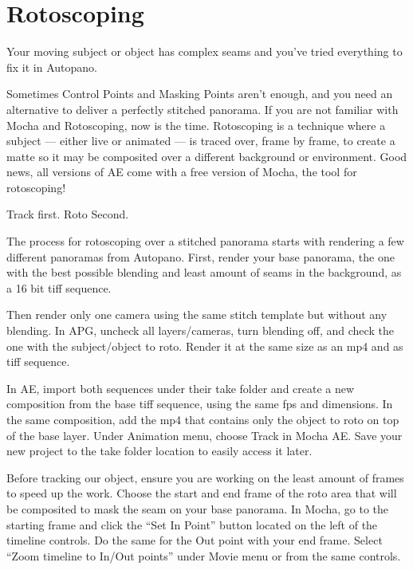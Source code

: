 \chapter{Rotoscoping}
\pagecolor{white}
\label{chap:50}
\begin{fullwidth}

\problem

{\large Your moving subject or object has complex seams and you’ve tried everything to fix it in Autopano. \par}

Sometimes Control Points and Masking Points aren’t enough, and you need an alternative to deliver a perfectly stitched panorama. If you are not familiar with Mocha and Rotoscoping, now is the time. Rotoscoping is a technique where a subject — either live or animated — is traced over, frame by frame, to create a matte so it may be composited over a different background or environment. Good news, all versions of AE come with a free version of Mocha, the tool for rotoscoping! 

\clearpage
\solution

{\large Track first. Roto Second. \par}

The process for rotoscoping over a stitched panorama starts with rendering a few different panoramas from Autopano. First, render your base panorama, the one with the best possible blending and least amount of seams in the background, as a 16 bit tiff sequence. 


Then render only one camera using the same stitch template but without any blending. In APG, uncheck all layers/cameras, turn blending off, and check the one with the subject/object to roto. Render it at the same size as an mp4 and as tiff sequence.


In AE, import both sequences under their take folder and create a new composition from the base tiff sequence, using the same fps and dimensions. In the same composition, add the mp4 that contains only the object to roto on top of the base layer. Under Animation menu, choose Track in Mocha AE. Save your new project to the take folder location to easily access it later. 


Before tracking our object, ensure you are working on the least amount of frames to speed up the work. Choose the start and end frame of the roto area that will be composited to mask the seam on your base panorama. In Mocha, go to the starting frame and click the “Set In Point” button located on the left of the timeline controls. Do the same for the Out point with your end frame. Select “Zoom timeline to In/Out points” under Movie menu or from the same controls.


\end{fullwidth}

